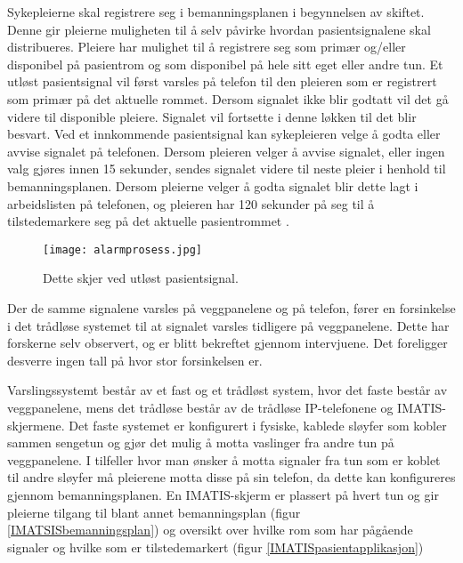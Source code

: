 \noindent
Sykepleierne skal registrere seg i bemanningsplanen i begynnelsen av skiftet. Denne gir pleierne muligheten til å selv påvirke hvordan pasientsignalene skal distribueres. Pleiere har mulighet til å registrere seg som primær og/eller disponibel på pasientrom og som disponibel på hele sitt eget eller andre tun. Et utløst pasientsignal vil først varsles på telefon til den pleieren som er registrert som primær på det aktuelle rommet. Dersom signalet ikke blir godtatt vil det gå videre til disponible pleiere. Signalet vil fortsette i denne løkken til det blir besvart.
Ved et innkommende pasientsignal kan sykepleieren velge å godta eller avvise signalet på telefonen. Dersom pleieren velger å avvise signalet, eller ingen valg gjøres innen 15 sekunder, sendes signalet videre til neste pleier i henhold til bemanningsplanen. Dersom pleierne velger å godta signalet blir dette lagt i arbeidslisten på telefonen, og pleieren har 120 sekunder på seg til å tilstedemarkere seg på det aktuelle pasientrommet \citep{BrukermanualforPasientsignalogPasientsignalapplikasjon}. 

\begin{figure}[H]
\centering
\texttt{[image: alarmprosess.jpg]}
\caption{Dette skjer ved utløst pasientsignal.}
\label{fig:detteskjer}
\end{figure}

\noindent
Der de samme signalene varsles på veggpanelene og på telefon, fører en forsinkelse i det trådløse systemet til at signalet varsles tidligere på veggpanelene. Dette har forskerne selv observert, og er blitt bekreftet gjennom intervjuene. Det foreligger desverre ingen tall på hvor stor forsinkelsen er. 

\noindent
Varslingssystemt består av et fast og et trådløst system, hvor det faste består av veggpanelene, mens det trådløse består av de trådløse IP-telefonene og IMATIS-skjermene.  Det faste systemet er konfigurert i fysiske, kablede sløyfer som kobler sammen sengetun og gjør det mulig å motta vaslinger fra andre tun på veggpanelene. I tilfeller hvor man ønsker å motta signaler fra tun som er koblet til andre sløyfer må pleierene motta disse på sin telefon, da dette kan konfigureres gjennom bemanningsplanen. En IMATIS-skjerm er plassert på hvert tun og gir pleierne tilgang til blant annet bemanningsplan (figur \ref{IMATSISbemanningsplan}) og oversikt over hvilke rom som har pågående signaler og hvilke som er tilstedemarkert (figur \ref{IMATISpasientapplikasjon}) 

